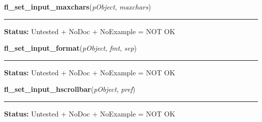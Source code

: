     \label{xformslib:library:fl_set_input_maxchars}

    \vspace{0.5ex}

\hspace{.8\funcindent}\begin{boxedminipage}{\funcwidth}

    \raggedright \textbf{fl\_set\_input\_maxchars}(\textit{pObject}, \textit{maxchars})

    \vspace{-1.5ex}

    \rule{\textwidth}{0.5\fboxrule}
\setlength{\parskip}{2ex}
\setlength{\parskip}{1ex}
\textbf{Status:} Untested + NoDoc + NoExample = NOT OK



    \end{boxedminipage}

    \label{xformslib:library:fl_set_input_format}

    \vspace{0.5ex}

\hspace{.8\funcindent}\begin{boxedminipage}{\funcwidth}

    \raggedright \textbf{fl\_set\_input\_format}(\textit{pObject}, \textit{fmt}, \textit{sep})

    \vspace{-1.5ex}

    \rule{\textwidth}{0.5\fboxrule}
\setlength{\parskip}{2ex}
\setlength{\parskip}{1ex}
\textbf{Status:} Untested + NoDoc + NoExample = NOT OK



    \end{boxedminipage}

    \label{xformslib:library:fl_set_input_hscrollbar}

    \vspace{0.5ex}

\hspace{.8\funcindent}\begin{boxedminipage}{\funcwidth}

    \raggedright \textbf{fl\_set\_input\_hscrollbar}(\textit{pObject}, \textit{pref})

    \vspace{-1.5ex}

    \rule{\textwidth}{0.5\fboxrule}
\setlength{\parskip}{2ex}
\setlength{\parskip}{1ex}
\textbf{Status:} Untested + NoDoc + NoExample = NOT OK



    \end{boxedminipage}

